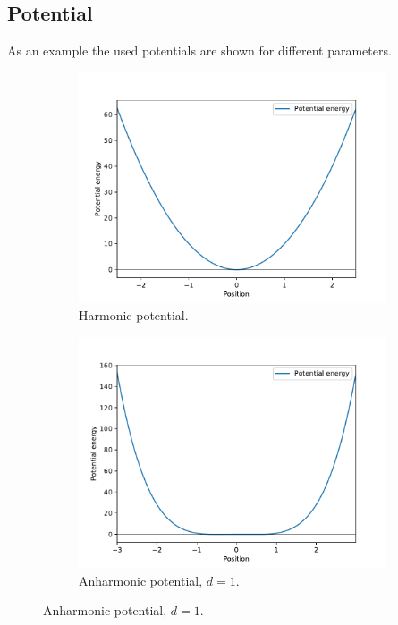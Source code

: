 \documentclass{scrartcl}
\begin{document}
	\subsection{Potential}
		As an example the used potentials are shown for different parameters.
		\begin{figure}[H]
			\centering
			\begin{subfigure}[c]{0.32\textwidth}
				\includegraphics[width=\textwidth]{../imgs/potential/harm_0_0.pdf}
				\caption{Harmonic potential.\newline}
				\label{fig:potential_harm0}
			\end{subfigure}
			\begin{subfigure}[c]{0.32\textwidth}
				\includegraphics[width=\textwidth]{../imgs/potential/anharm_1_0.pdf}
				\caption{Anharmonic potential, \newline$d=1$.}
				\label{fig:potential_anharm1}
			\end{subfigure}


\end{figure}
\end{document}
